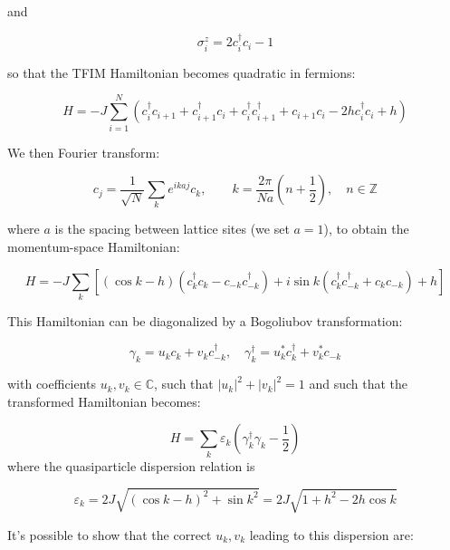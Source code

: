 \documentclass{article}
\begin{document}
and

\begin{equation}
\sigma^z_i = 2 c^\dagger_i c_i - 1
\end{equation}

so that the TFIM Hamiltonian becomes quadratic in fermions:

\begin{equation}
H = -J \sum_{i=1}^N \left( c^\dag_i c_{i+1} +  c^\dag_{i+1} c_i +  c^\dag_i c^\dag_{i+1} + c_{i+1} c_i - 2h  c^\dag_i c_i + h \right)
\end{equation} 

We then Fourier transform: 

\begin{equation}
 c_j = \frac{1}{\sqrt{N}} \sum_k e^{i k a j} c_k, \qquad k = \frac{2\pi}{Na} \left(n + \frac{1}{2}\right), \quad n \in \mathbb{Z}
 \end{equation} 
 
 where $a$ is the spacing between lattice sites (we set $a=1$), to obtain the momentum-space Hamiltonian:
 
 \begin{equation} 
 H = -J \sum_k \left[ (\cos k - h)(c^\dagger_k c_k - c_{-k} c^\dagger_{-k}) + i \sin k (c^\dagger_k c^\dagger_{-k} + c_k c_{-k}) + h \right] 
\end{equation}

This Hamiltonian can be diagonalized by a Bogoliubov transformation: 

\begin{equation} 
\gamma_k = u_k c_k + v_k c^\dagger_{-k}, \quad \gamma^\dagger_k = u^*_k c^\dagger_k + v^*_k c_{-k} 
\end{equation} 

with coefficients $u_k,v_k\in\mathbb{C}$, such that $|u_k|^2 + |v_k|^2 = 1$ and such that the transformed Hamiltonian becomes: 

\begin{equation} 
H = \sum_k \varepsilon_k \left( \gamma^\dagger_k \gamma_k - \frac{1}{2} \right) 
\end{equation} where the quasiparticle dispersion relation is 

\begin{equation} 
\varepsilon_k = 2J \sqrt{(\cos k - h)^2 + \sin k^2} = 2J \sqrt{1 + h^2 - 2h \cos k}
\end{equation}

It's possible to show that the correct $u_k, v_k$ leading to this dispersion are:
\end{document}
